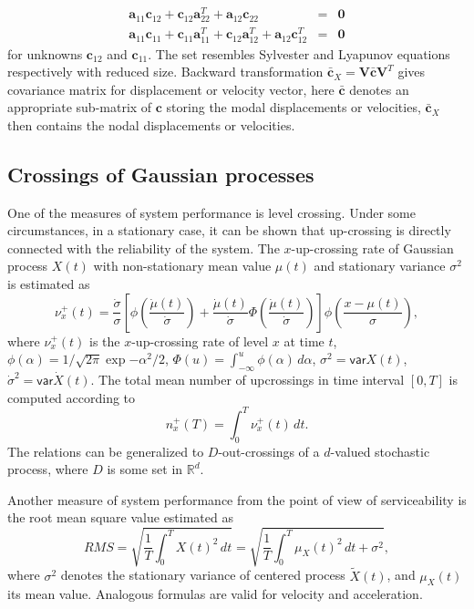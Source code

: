 \documentclass[preprint,12pt,authoryear]{elsarticle}
\newcommand{\bs}[1]{{\boldsymbol{#1}}}
\begin{document}
\begin{eqnarray}
\bs{a}_{11}\bs{c}_{12}+\bs{c}_{12}\bs{a}^T_{22}+\bs{a}_{12}\bs{c}_{22} &=& \bs{0} \label{modal5}\\
\bs{a}_{11}\bs{c}_{11}+\bs{c}_{11}\bs{a}^T_{11}+\bs{c}_{12}\bs{a}^T_{12} + \bs{a}_{12}\bs{c}^T_{12} &=& \bs{0}\label{modal6}
\end{eqnarray}
for unknowns $\bs{c}_{12}$ and $\bs{c}_{11}$. The set resembles Sylvester and Lyapunov equations respectively with reduced size. Backward transformation $\bs{\bar{c}}_X=\bs{V\bar{c}}\bs{V}^T$ gives covariance matrix for displacement or velocity vector, here $\bs{\bar{c}}$ denotes an appropriate sub-matrix of $\bs{c}$ storing the modal displacements or velocities, $\bs{\bar{c}}_X$ then contains the nodal displacements or velocities.
\subsection{Crossings of Gaussian processes}
\label{upcrossing}
One of the measures of system performance is level crossing. Under some circumstances, in a stationary case, it can be shown that up-crossing is directly connected with the reliability of the system. The $x$-up-crossing rate of Gaussian process $X(t)$ with non-stationary mean value $\mu(t)$ and stationary variance $\sigma^2$ is estimated as \citep{Soong}
\begin{equation}
\nu_x^+(t)=\frac{\dot{\sigma}}{\sigma}\left[\phi\left(\frac{\dot{\mu}(t)}{\dot{\sigma}}\right)+\frac{\dot{\mu}(t)}{\dot{\sigma}}\Phi\left(\frac{\dot{\mu}(t)}{\dot{\sigma}}\right)\right]\phi\left(\frac{x-\mu(t)}{\sigma}\right),
\label{2eq22}
\end{equation}
where $\nu_x^+(t)$ is the $x$-up-crossing rate of level $x$ at time $t$, $\phi(\alpha)=1/\sqrt{2\pi}\exp{-\alpha^2/2}$, $\Phi(u)=\int_{-\infty}^u\phi(\alpha)\,d\alpha$, $\sigma^2=\mathsf{var}X(t)$, $\dot{\sigma}^2=\mathsf{var}\dot{X}(t)$. The total mean number of upcrossings in time interval $[0,T]$ is computed according to
\begin{equation}
n_x^+(T)=\int_0^T\nu_x^+(t)\,dt.
\label{2eq23}
\end{equation}
The relations can be generalized to $D$-out-crossings of a $d$-valued stochastic process, where $D$ is some set in $\mathbb{R}^d$.

Another measure of system performance from the point of view of serviceability is the root mean square value estimated as
\begin{equation}
RMS=\sqrt{\frac{1}{T}\int_0^TX(t)^2\,dt}=\sqrt{\frac{1}{T}\int_0^T\mu_X(t)^2\,dt+\sigma^2},
\label{2eq24}
\end{equation}
where $\sigma^2$ denotes the stationary variance of centered process $\tilde{X}(t)$, and $\mu_X(t)$ its mean value. Analogous formulas are valid for velocity and acceleration.
\end{document}

